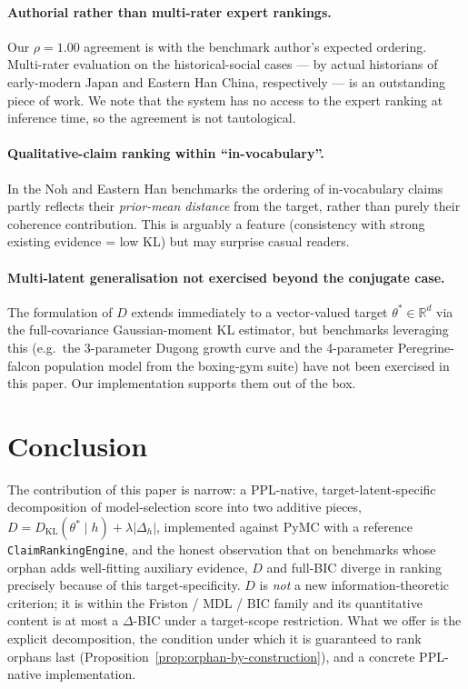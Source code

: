 \documentclass{article}
\begin{document}
\paragraph{Authorial rather than multi-rater expert rankings.} Our
$\rho = 1.00$ agreement is with the benchmark author's expected
ordering. Multi-rater evaluation on the historical-social cases ---
by actual historians of early-modern Japan and Eastern Han China,
respectively --- is an outstanding piece of work. We note that the
system has no access to the expert ranking at inference time, so the
agreement is not tautological.

\paragraph{Qualitative-claim ranking within ``in-vocabulary''.} In
the Noh and Eastern Han benchmarks the ordering of in-vocabulary
claims partly reflects their \emph{prior-mean distance} from the
target, rather than purely their coherence contribution. This is
arguably a feature (consistency with strong existing evidence =
low KL) but may surprise casual readers.

\paragraph{Multi-latent generalisation not exercised beyond the
conjugate case.} The formulation of $D$ extends immediately to a
vector-valued target $\theta^{*} \in \mathbb{R}^{d}$ via the
full-covariance Gaussian-moment KL estimator, but benchmarks
leveraging this (e.g.\ the 3-parameter Dugong growth curve and the
4-parameter Peregrine-falcon population model from the
boxing-gym suite) have not been exercised in this paper. Our
implementation supports them out of the box.

\section{Conclusion}
\label{sec:conclusion}

The contribution of this paper is narrow: a PPL-native,
target-latent-specific decomposition of model-selection score into
two additive pieces, $D = D_{\mathrm{KL}}(\theta^{*} \mid h) + \lambda
|\Delta_{h}|$, implemented against PyMC with a reference
\texttt{ClaimRankingEngine}, and the honest observation that on
benchmarks whose orphan adds well-fitting auxiliary evidence, $D$
and full-BIC diverge in ranking precisely because of this
target-specificity. $D$ is \emph{not} a new information-theoretic
criterion; it is within the Friston / MDL / BIC family and its
quantitative content is at most a $\Delta$-BIC under a target-scope
restriction. What we offer is the explicit decomposition, the
condition under which it is guaranteed to rank orphans last
(Proposition~\ref{prop:orphan-by-construction}), and a concrete
PPL-native implementation.
\end{document}
